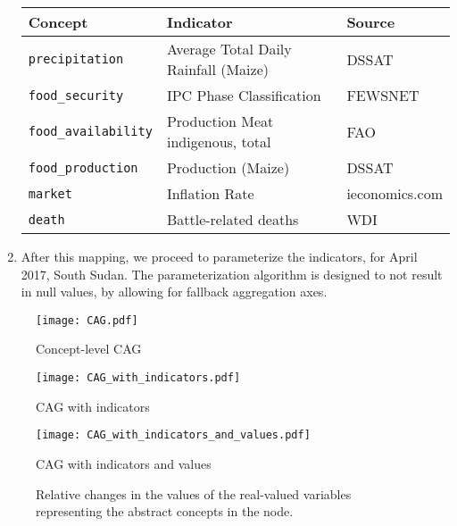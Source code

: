 \documentclass{apnotes}
\begin{document}
\begin{enumerate}
  {\centering
  \begin{tabular}{lll}
    \toprule
    Concept                     & Indicator                            & Source\\
    \midrule
    \texttt{precipitation}      & Average Total Daily Rainfall (Maize) & DSSAT\\
    \texttt{food\_security}     & IPC Phase Classification             & FEWSNET\\
    \texttt{food\_availability} & Production Meat indigenous, total    & FAO\\
    \texttt{food\_production}   & Production (Maize)                   & DSSAT\\
    \texttt{market}             & Inflation Rate                       & ieconomics.com\\
    \texttt{death}              & Battle-related deaths                & WDI\\
    \bottomrule
  \end{tabular}
  }

\item After this mapping, we proceed to parameterize the indicators, for April
  2017, South Sudan. The parameterization algorithm is designed to not result in
  null values, by allowing for fallback aggregation axes.
\end{enumerate}

\begin{figure}
  \centering
  \texttt{[image: CAG.pdf]}
  \caption{Concept-level CAG}
  \label{fig:precipitation_centered_cag}
\end{figure}

\begin{figure}
  \centering
  \texttt{[image: CAG\_with\_indicators.pdf]}
  \caption{CAG with indicators}
\end{figure}

\begin{figure}
  \centering
  \texttt{[image: CAG\_with\_indicators\_and\_values.pdf]}
  \caption{CAG with indicators and values}
\end{figure}

\begin{figure}
  
  \caption{Relative changes in the values of the real-valued variables
  representing the abstract concepts in the node.}
\end{figure}
\end{document}
